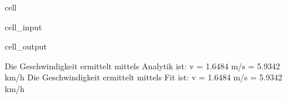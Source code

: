 \documentclass[letterpaper,10pt,english]{jupyterBook}
\begin{document}
\begin{sphinxuseclass}{cell}\begin{sphinxVerbatimInput}

\begin{sphinxuseclass}{cell_input}
\begin{sphinxVerbatim}[commandchars=\\\{\}]
  
  \PYG{p}{[}\PYG{p}{]}\PYG{p}{[}\PYG{p}{]}
  
  
\end{sphinxVerbatim}

\end{sphinxuseclass}\end{sphinxVerbatimInput}
\begin{sphinxVerbatimOutput}

\begin{sphinxuseclass}{cell_output}
\begin{sphinxVerbatim}[commandchars=\\\{\}]
Die Geschwindigkeit ermittelt mittels Analytik ist: v = 1.6484 m/s = 5.9342 km/h
Die Geschwindigkeit ermittelt mittels Fit ist:      v = 1.6484 m/s = 5.9342 km/h
\end{sphinxVerbatim}

\end{sphinxuseclass}\end{sphinxVerbatimOutput}

\end{sphinxuseclass}
\end{document}
